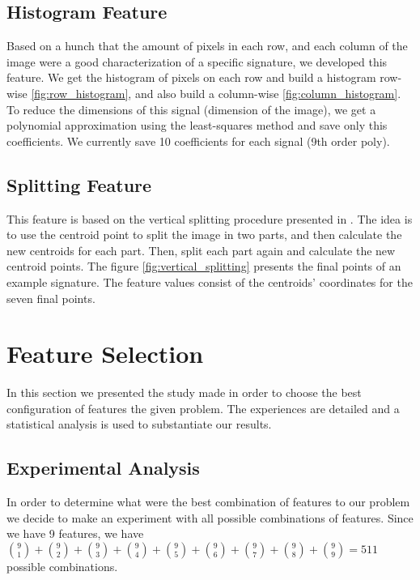 \documentclass[12pt,a4paper]{report}
\begin{document}
		\section{Histogram Feature}
		Based on a hunch that the amount of pixels in each row, and each column of the image were a good characterization of a specific signature, we developed this feature. We get the histogram of pixels on each row and build a histogram row-wise \ref{fig:row_histogram}, and also build a column-wise \ref{fig:column_histogram}. To reduce the dimensions of this signal (dimension of the image), we get a polynomial approximation using the least-squares method and save only this coefficients. We currently save 10 coefficients for each signal (9th order poly).
		
		
		\section{Splitting Feature}
		This feature is based on the vertical splitting procedure presented in \cite{Majhi2006}. The idea is to use the centroid point to split the image in two parts, and then calculate the new centroids for each part. Then, split each part again and calculate the new centroid points. The figure \ref{fig:vertical_splitting} presents the final points of an example signature. The feature values consist of the centroids' coordinates for the seven final points.
		
		
		\chapter{Feature Selection}
		\label{sec:feature_selection}
		In this section we presented the study made in order to choose the best configuration of features the given problem. The experiences are detailed and a statistical analysis is used to substantiate our results.
		\section{Experimental Analysis}
		\label{sec:feat_sec_ea}
		
		In order to determine what were the best combination of features to our problem we decide to make an experiment with all possible combinations of features. Since we have 9 features, we have $
			{9 \choose 1} + {9 \choose 2} + {9 \choose 3} + 
			{9 \choose 4} + {9 \choose 5} + {9 \choose 6}
			+ {9 \choose 7} + {9 \choose 8} + {9 \choose 9} = 511$
		possible combinations.
		
\end{document}
